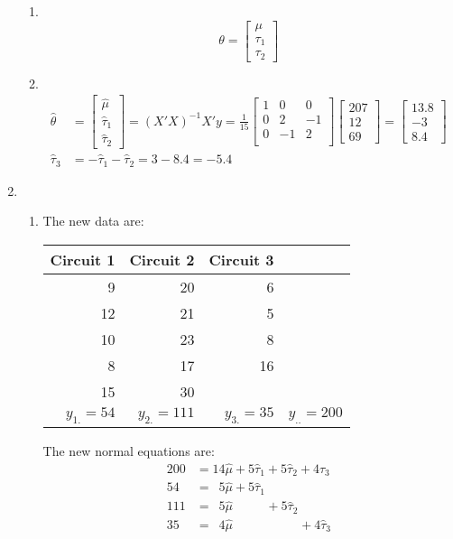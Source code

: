 \documentclass[11pt]{article}
\begin{document}
\begin{enumerate}
\begin{enumerate}
\item ~%
\vspace{-22pt}\begin{equation*}
\theta=\begin{bmatrix}
\mu\\ \tau_1\\ \tau_2
\end{bmatrix}
\end{equation*}

\item ~%
\vspace{-22pt}\begin{align*}
\widehat\theta&=\begin{bmatrix}
\widehat\mu\\ \widehat\tau_1\\ \widehat\tau_2
\end{bmatrix}=(X'X)^{-1}X'y=\frac{1}{15}\begin{bmatrix}
1&0&0\\
0&2&-1\\
0&-1&2\\
\end{bmatrix}\begin{bmatrix}
207\\12\\69
\end{bmatrix}
=\begin{bmatrix}
13.8\\-3\\8.4
\end{bmatrix}\\
\widehat\tau_3&=-\widehat\tau_1-\widehat\tau_2=3-8.4=-5.4
\end{align*}

\end{enumerate}

\pagebreak
\item %
\begin{enumerate}

\item %
The new data are:
\begin{center}\begin{tabular}{rrrr}
Circuit 1 & Circuit 2 & Circuit 3 & \\
\hline
 9 & 20 &  6 & \\
12 & 21 &  5 & \\
10 & 23 &  8 & \\
 8 & 17 & 16 & \\
15 & 30 &    & \\
\hline
\(y_{1.}=54\) & \(y_{2.}=111\) & \(y_{3.}=35\) & \(y_{..}=200\)
\end{tabular}\end{center}
The new normal equations are:
\begin{align}
200&=14\widehat\mu+5\widehat\tau_1+5\widehat\tau_2+4\widehat\tau_3\\
 54&=\:\;5\widehat\mu+5\widehat\tau_1\\
111&=\:\;5\widehat\mu\qquad\:\:\,+5\widehat\tau_2\\
 35&=\:\;4\widehat\mu\qquad\qquad\quad\:+4\widehat\tau_3
\end{align}


\end{enumerate}
\end{enumerate}
\end{document}
